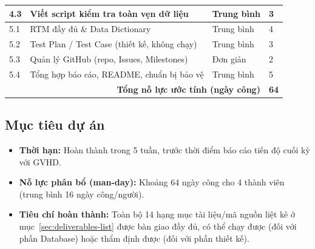 \begin{table}[htbp]
{\begin{tabular}{|p{1cm}|p{7cm}|p{2.3cm}|p{2cm}|}
        \hline
        4.3 & Viết script kiểm tra toàn vẹn dữ liệu & Trung bình & 3 \\
        \hline
        5.1 & RTM đầy đủ \& Data Dictionary & Trung bình & 4 \\
        \hline
        5.2 & Test Plan / Test Case (thiết kế, không chạy) & Trung bình & 3 \\
        \hline
        5.3 & Quản lý GitHub (repo, Issues, Milestones) & Đơn giản & 2 \\
        \hline
        5.4 & Tổng hợp báo cáo, README, chuẩn bị bảo vệ & Trung bình & 5 \\
        \hline
        \multicolumn{3}{|r|}{\textbf{Tổng nỗ lực ước tính (ngày công)}} & \textbf{64} \\
        \hline
    \end{tabular}
    }
\end{table}

\subsection{Mục tiêu dự án}
\begin{itemize}
    \item \textbf{Thời hạn:} Hoàn thành trong 5 tuần, trước thời điểm báo cáo tiến độ cuối kỳ với GVHD.
    \item \textbf{Nỗ lực phân bổ (man-day):} Khoảng 64 ngày công cho 4 thành viên (trung bình 16 ngày công/người).
    \item \textbf{Tiêu chí hoàn thành:} Toàn bộ 14 hạng mục tài liệu/mã nguồn liệt kê ở mục~\ref{sec:deliverables-list} được bàn giao đầy đủ, có thể chạy được (đối với phần Database) hoặc thẩm định được (đối với phần thiết kế).
\end{itemize}

